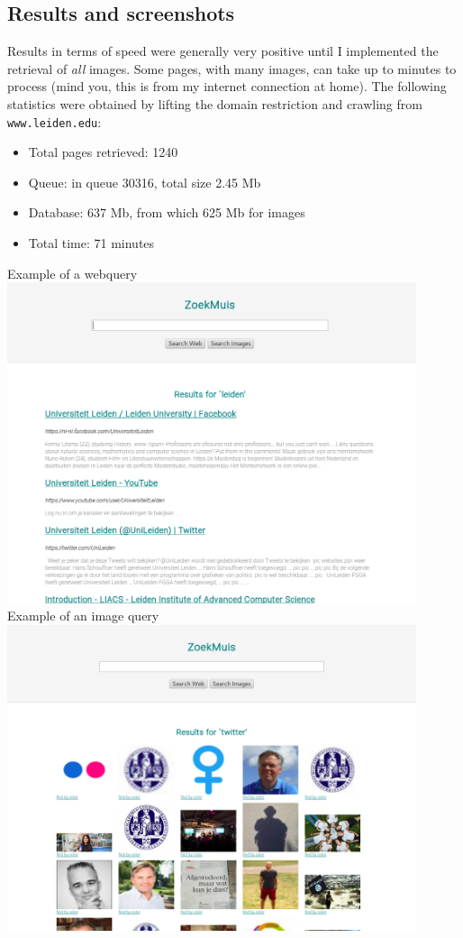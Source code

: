\documentclass[10pt,a4paper]{article}
\begin{document}
\subsection{Results and screenshots}

Results in terms of speed were generally very positive until I implemented the retrieval of \emph{all} images. Some pages, with many images, can take up to minutes to process (mind you, this is from my internet connection at home). The following statistics were obtained by lifting the domain restriction and crawling from \texttt{www.leiden.edu}:
\begin{itemize}
\item Total pages retrieved: 1240
\item Queue: in queue 30316, total size 2.45 Mb
\item Database: 637 Mb, from which 625 Mb for images
\item Total time: 71 minutes
\end{itemize} \newpage
Example of a webquery \newline
\includegraphics[width=12cm]{zoekmuis_web.png}\newline
Example of an image query \newline
\includegraphics[width=12cm]{zoekmuis_images.png}\newline
\end{document}
